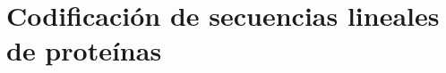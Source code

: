 \chapter{Codificación de secuencias lineales de proteínas}

\ifpdf
    \graphicspath{{Chapter3/Figs/Raster/}{Chapter3/Figs/PDF/}{Chapter3/Figs/}}
\else
    \graphicspath{{Chapter3/Figs/Vector/}{Chapter3/Figs/}}
\fi
 